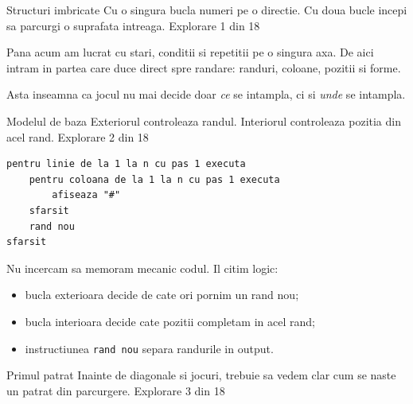\PageHeader
  {Structuri imbricate}
  {Cu o singura bucla numeri pe o directie. Cu doua bucle incepi sa parcurgi o suprafata intreaga.}
  {Explorare 1 din 18}

\begin{missionbox}
Pana acum am lucrat cu stari, conditii si repetitii pe o singura axa. De aici intram in partea care duce direct spre randare: randuri, coloane, pozitii si forme.

Asta inseamna ca jocul nu mai decide doar \textit{ce} se intampla, ci si \textit{unde} se intampla.
\end{missionbox}


\clearpage

\PageHeader
  {Modelul de baza}
  {Exteriorul controleaza randul. Interiorul controleaza pozitia din acel rand.}
  {Explorare 2 din 18}

\begin{examplebox}
\begin{lstlisting}[style=codequest]
pentru linie de la 1 la n cu pas 1 executa
    pentru coloana de la 1 la n cu pas 1 executa
        afiseaza "#"
    sfarsit
    rand nou
sfarsit
\end{lstlisting}
\end{examplebox}

\begin{conceptbox}
Nu incercam sa memoram mecanic codul. Il citim logic:
\begin{itemize}
\item bucla exterioara decide de cate ori pornim un rand nou;
\item bucla interioara decide cate pozitii completam in acel rand;
\item instructiunea \texttt{rand nou} separa randurile in output.
\end{itemize}
\end{conceptbox}


\clearpage

\PageHeader
  {Primul patrat}
  {Inainte de diagonale si jocuri, trebuie sa vedem clar cum se naste un patrat din parcurgere.}
  {Explorare 3 din 18}

